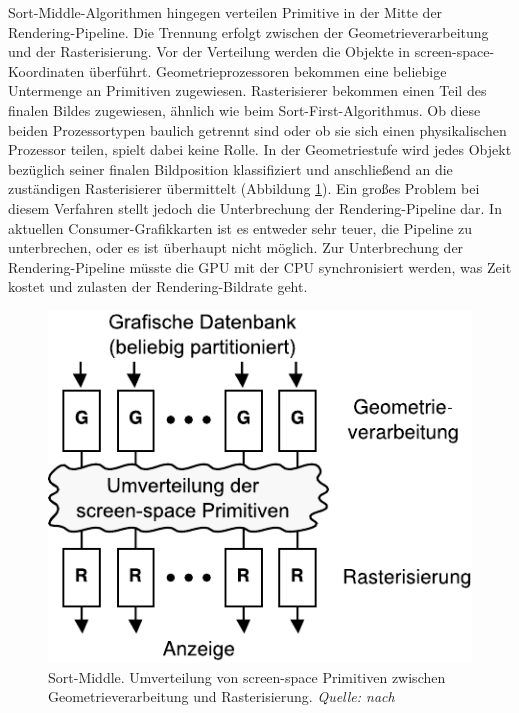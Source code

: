 Sort-Middle-Algorithmen hingegen verteilen Primitive in der Mitte der Ren\-de\-ring-Pipeline. Die Trennung erfolgt zwischen der Geometrieverarbeitung und der Rasterisierung. Vor der Verteilung werden die Objekte in screen-space-Koordinaten überführt. Geometrieprozessoren bekommen eine beliebige Untermenge an Primitiven zugewiesen. Rasterisierer bekommen einen Teil des finalen Bildes zugewiesen, ähnlich wie beim Sort-First-Algorithmus. Ob diese beiden Prozessortypen baulich getrennt sind oder ob sie sich einen physikalischen Prozessor teilen, spielt dabei keine Rolle. In der Geometriestufe wird jedes Objekt bezüglich seiner finalen Bildposition klassifiziert und anschließend an die zuständigen Rasterisierer übermittelt (Abbildung \ref{fig:relwork:sortmiddle}). Ein großes Problem bei diesem Verfahren stellt jedoch die Unterbrechung der Rendering-Pipeline dar. In aktuellen Consumer-Grafikkarten ist es entweder sehr teuer, die Pipeline zu unterbrechen, oder es ist überhaupt nicht möglich. Zur Unterbrechung der Rendering-Pipeline müsste die GPU mit der CPU synchronisiert werden, was Zeit kostet und zulasten der Rendering-Bildrate geht.
\begin{figure}
 \centering
  \includegraphics[scale=0.8]{images/sort-middle.pdf}
  \caption[Sort-Middle]{Sort-Middle. Umverteilung von screen-space Primitiven zwischen Geometrieverarbeitung und Rasterisierung. \textit{Quelle: nach}}
 \label{fig:relwork:sortmiddle}
\end{figure}


